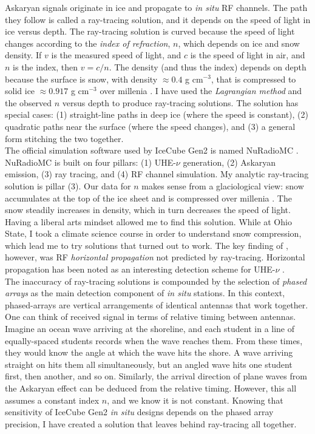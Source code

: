 \documentclass[../../../main.tex]{subfiles}
\begin{document}
Askaryan signals originate in ice and propagate to \textit{in situ} RF channels.  The path they follow is called a ray-tracing solution, and it depends on the speed of light in ice versus depth.  The ray-tracing solution is curved because the speed of light changes according to the \textit{index of refraction}, $n$, which depends on ice and snow density.  If $v$ is the measured speed of light, and $c$ is the speed of light in air, and $n$ is the index, then $v = c/n$.  The density (and thus the index) depends on depth because the surface is snow, with density $\approx 0.4$ g cm$^{-3}$, that is compressed to solid ice $\approx 0.917$ g cm$^{-3}$ over millenia \cite{10.3189/2015jog14j214}.  I have used the \textit{Lagrangian method} and the observed $n$ versus depth to produce ray-tracing solutions.  The solution has special cases: (1) straight-line paths in deep ice (where the speed is constant), (2) quadratic paths near the surface (where the speed changes), and (3) a general form stitching the two together.
\\
\vspace{0.15cm}
The official simulation software used by IceCube Gen2 is named NuRadioMC \cite{10.1140/epjc/s10052-020-7612-8}.  NuRadioMC is built on four pillars: (1) UHE-$\nu$ generation, (2) Askaryan emission, (3) ray tracing, and (4) RF channel simulation.  My analytic ray-tracing solution is pillar (3).  Our data for $n$ makes sense from a glaciological view: snow accumulates at the top of the ice sheet and is compressed over millenia \cite{Barwick:2018497}.  The snow steadily increases in density, which in turn decreases the speed of light.  Having a liberal arts mindset allowed me to find this solution.  While at Ohio State, I took a climate science course in order to understand snow compression, which lead me to try solutions that turned out to work.  The key finding of \cite{Barwick:2018497}, however, was RF \textit{horizontal propagation} not predicted by ray-tracing.  Horizontal propagation has been noted as an interesting detection scheme for UHE-$\nu$ \cite{10.1103/physrevd.71.011503}.
\\
\vspace{0.15cm}
The inaccuracy of ray-tracing solutions is compounded by the selection of \textit{phased arrays} as the main detection component of \textit{in situ} stations.  In this context, phased-arrays are vertical arrangements of identical antennas that work together.  One can think of received signal in terms of relative timing between antennas.  Imagine an ocean wave arriving at the shoreline, and each student in a line of equally-spaced students records when the wave reaches them.  From these times, they would know the angle at which the wave hits the shore.  A wave arriving straight on hits them all simultaneously, but an angled wave hits one student first, then another, and so on.  Similarly, the arrival direction of plane waves from the Askaryan effect can be deduced from the relative timing. However, this all assumes a constant index $n$, and we know it is not constant.  Knowing that sensitivity of IceCube Gen2 \textit{in situ} designs depends on the phased array precision, I have created a solution that leaves behind ray-tracing all together.
\end{document}
